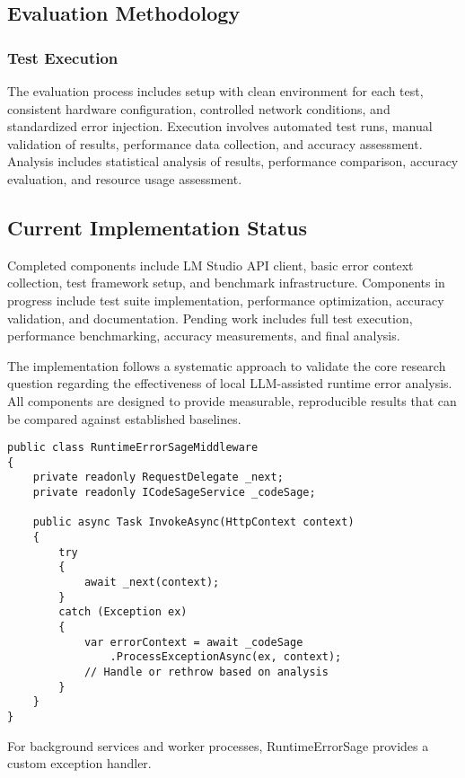 \subsection{Evaluation Methodology}

\subsubsection{Test Execution}
The evaluation process includes setup with clean environment for each test, consistent hardware configuration, controlled network conditions, and standardized error injection. Execution involves automated test runs, manual validation of results, performance data collection, and accuracy assessment. Analysis includes statistical analysis of results, performance comparison, accuracy evaluation, and resource usage assessment.

\subsection{Current Implementation Status}
Completed components include LM Studio API client, basic error context collection, test framework setup, and benchmark infrastructure. Components in progress include test suite implementation, performance optimization, accuracy validation, and documentation. Pending work includes full test execution, performance benchmarking, accuracy measurements, and final analysis.

The implementation follows a systematic approach to validate the core research question regarding the effectiveness of local LLM-assisted runtime error analysis. All components are designed to provide measurable, reproducible results that can be compared against established baselines.

\begin{lstlisting}[style=csharpstyle,caption={ASP.NET Core Middleware Integration},label=lst:middleware-impl]
public class RuntimeErrorSageMiddleware
{
    private readonly RequestDelegate _next;
    private readonly ICodeSageService _codeSage;

    public async Task InvokeAsync(HttpContext context)
    {
        try
        {
            await _next(context);
        }
        catch (Exception ex)
        {
            var errorContext = await _codeSage
                .ProcessExceptionAsync(ex, context);
            // Handle or rethrow based on analysis
        }
    }
}
\end{lstlisting}

For background services and worker processes, RuntimeErrorSage provides a custom exception handler.

